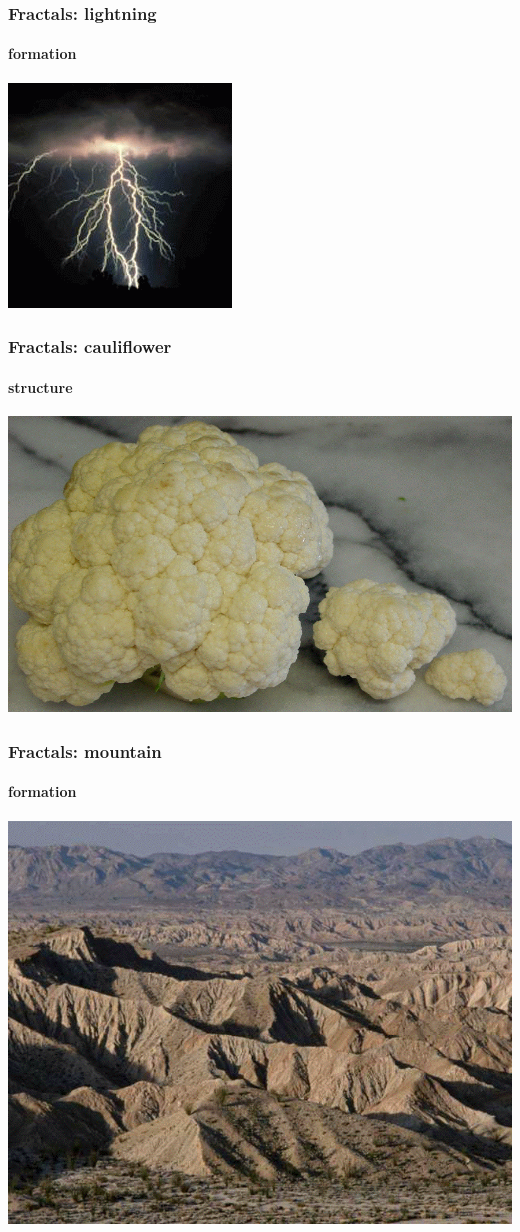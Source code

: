 \documentclass[10pt]{beamer}
\begin{document}
\begin{frame}
\frametitle{Fractals: lightning}
\framesubtitle{formation}
\begin{center}
\includegraphics[height=0.9\textheight]{figs/fractal14}
\end{center}
\end{frame}
\begin{frame}
\frametitle{Fractals: cauliflower}
\framesubtitle{structure}
\begin{center}
\includegraphics[height=0.9\textheight]{figs/fractal15}
\end{center}
\end{frame}
\begin{frame}
\frametitle{Fractals: mountain}
\framesubtitle{formation}
\begin{center}
\includegraphics[height=0.9\textheight]{figs/fractal16}
\end{center}
\end{frame}
\end{document}
